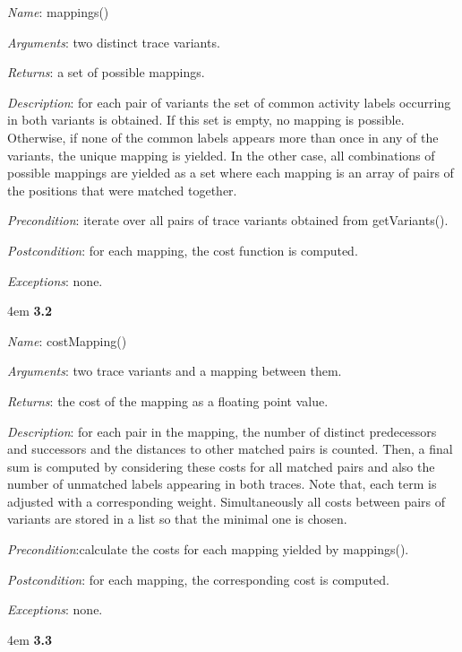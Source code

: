 \documentclass[notitlepage]{article}
\begin{document}
\begin{flushleft}
\textit{Name}: mappings()

\textit{Arguments}: two distinct trace variants.

\textit{Returns}: a set of possible mappings.

\textit{Description}: for each pair of variants the set of common activity labels occurring in both variants is obtained. If this set is empty, no mapping is possible. Otherwise, if none of the common labels appears more than once in any of the variants, the unique mapping is yielded. In the other case, all combinations of possible mappings are yielded as a set where each mapping is an array of pairs of the positions that were matched together.

\textit{Precondition}: iterate over all pairs of trace variants obtained from getVariants().

\textit{Postcondition}: for each mapping, the cost function is computed.

\textit{Exceptions}: none.
\par
\endgroup


\medskip

\par
\begingroup
\leftskip4em
\textbf{3.2} 

\textit{Name}: costMapping()

\textit{Arguments}: two trace variants and a mapping between them.

\textit{Returns}: the cost of the mapping as a floating point value.

\textit{Description}: for each pair in the mapping, the number of distinct predecessors and successors and the distances to other matched pairs is counted. Then, a final sum is computed by considering these costs for all matched pairs and also the number of unmatched labels appearing in both traces. Note that, each term is adjusted with a corresponding weight. Simultaneously all costs between pairs of variants are stored in a list so that the minimal one is chosen.

\textit{Precondition}:calculate the costs for each mapping yielded by mappings().

\textit{Postcondition}: for each mapping, the corresponding cost is computed.

\textit{Exceptions}: none.
\par
\endgroup


\medskip

\par
\begingroup
\leftskip4em
\textbf{3.3} 


\end{flushleft}
\end{document}
